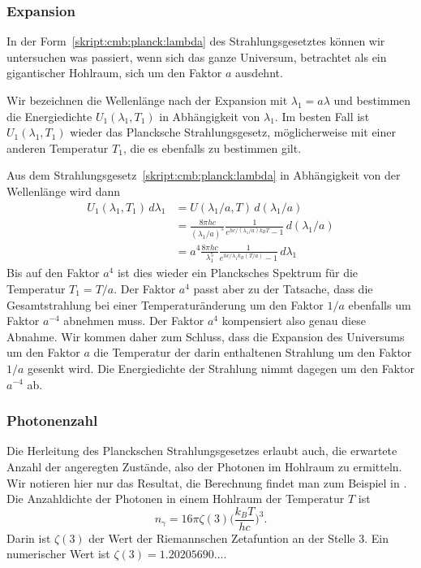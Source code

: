 \subsubsection{Expansion}
In der Form~\eqref{skript:cmb:planck:lambda}
des Strahlungsgesetztes können wir untersuchen was
passiert, wenn sich das ganze Universum, betrachtet als ein gigantischer
Hohlraum, sich um den Faktor $a$ ausdehnt.

Wir bezeichnen die Wellenlänge nach der Expansion mit $\lambda_1=a\lambda$
und bestimmen die Energiedichte $U_1(\lambda_1,T_1)$ in Abhängigkeit von
$\lambda_1$.
Im besten Fall ist $U_1(\lambda_1,T_1)$ wieder das Plancksche
Strahlungsgesetz, möglicherweise mit einer anderen Temperatur $T_1$, die
es ebenfalls zu bestimmen gilt.

Aus dem Strahlungsgesetz~\eqref{skript:cmb:planck:lambda} in Abhängigkeit
von der Wellenlänge wird dann
\begin{align*}
U_1(\lambda_1,T_1)\,d\lambda_1
&=
U(\lambda_1/a,T)\,d(\lambda_1/a)
\\
&=
\frac{8\pi hc}{(\lambda_1/a)^5}
\frac{1}{e^{hc/(\lambda_1/a) k_BT}-1}\,d(\lambda_1/a)
\\
&=
a^4
\frac{8\pi hc}{\lambda_1^5}
\frac{1}{e^{hc/\lambda_1 k_B(T/a)}-1}\,d\lambda_1
\end{align*}
Bis auf den Faktor $a^4$ ist dies wieder ein Plancksches Spektrum
für die Temperatur $T_1=T/a$.
Der Faktor $a^4$ passt aber zu der Tatsache, dass die Gesamtstrahlung
bei einer Temperaturänderung um den Faktor $1/a$ ebenfalls um Faktor
$a^{-4}$ abnehmen muss.
Der Faktor $a^4$ kompensiert also genau diese Abnahme.
Wir kommen daher zum Schluss, dass die Expansion des Universums um den
Faktor $a$ die Temperatur der darin enthaltenen Strahlung um den Faktor
$1/a$ gesenkt wird.
Die Energiedichte der Strahlung nimmt dagegen um den Faktor $a^{-4}$ ab.

\subsubsection{Photonenzahl}
Die Herleitung des Planckschen Strahlungsgesetzes erlaubt auch, die
erwartete Anzahl der angeregten Zustände, also der Photonen im
Hohlraum zu ermitteln.
Wir notieren hier nur das Resultat, die Berechnung findet man zum
Beispiel in \cite[Abschnitt 1.9]{skript:feynman}.
Die Anzahldichte der Photonen in einem Hohlraum der Temperatur $T$ ist
\begin{equation}
n_\gamma
=
16\pi\zeta(3)
\biggl(\frac{k_BT}{hc}\biggr)^3.
\label{skript:cmb:photonenzahl}
\end{equation}
Darin ist $\zeta(3)$ der Wert der Riemannschen Zetafuntion an der
Stelle $3$.
%
%
Ein numerischer Wert ist $\zeta(3)=1.20205690\dots$.

